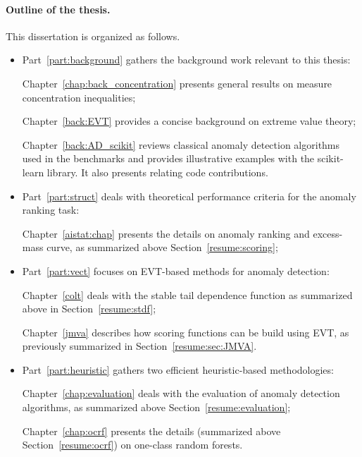 \paragraph{Outline of the thesis.}
This dissertation is organized as follows. 
\begin{itemize}
\item Part~\ref{part:background} gathers the background work relevant to this thesis:

Chapter~\ref{chap:back_concentration} presents general results on measure concentration inequalities; 

Chapter~\ref{back:EVT} provides a concise background on extreme value theory;

Chapter~\ref{back:AD_scikit} reviews classical anomaly detection algorithms used in the benchmarks and provides illustrative examples with the scikit-learn library. It also presents relating code contributions.

\item Part~\ref{part:struct} deals with theoretical performance criteria for the anomaly ranking task:

Chapter~\ref{aistat:chap} presents the details on anomaly ranking and excess-mass curve, as summarized above Section~\ref{resume:scoring}; %

\item Part~\ref{part:vect} focuses on EVT-based methods for anomaly detection:

Chapter~\ref{colt} deals with the stable tail dependence function as summarized above in Section~\ref{resume:stdf}; %

Chapter~\ref{jmva} describes how scoring functions can be build using EVT, as previously summarized in Section~\ref{resume:sec:JMVA}.


\item Part~\ref{part:heuristic} gathers two efficient heuristic-based methodologies:

Chapter~\ref{chap:evaluation} deals with the evaluation of anomaly detection algorithms, as summarized above Section~\ref{resume:evaluation}; %

Chapter~\ref{chap:ocrf} presents the details %
  (summarized above Section~\ref{resume:ocrf}) on one-class random forests.


\end{itemize}
